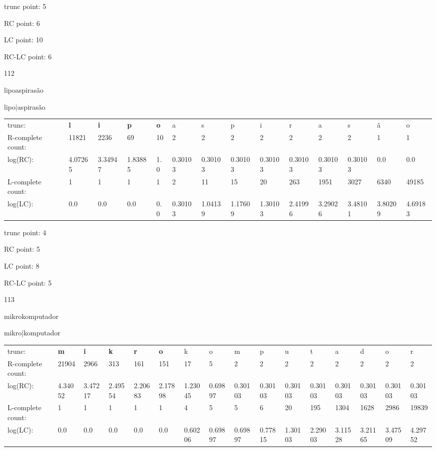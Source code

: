 \documentclass{article}
\begin{document}
trunc point: 5

RC point: 6

LC point: 10

RC-LC point: 6

\vspace{3em}



112

lipoaspirasão

lipo$|$aspirasão

\vspace{1em}

\begin{tabular}{l|lllllllllllll}

trunc: & {\color{red}\bf l} & {\color{red}\bf i} & {\color{red}\bf p} & {\color{red}\bf o} & a & s & p & i & r & a & s & ã & o \\ 
R-complete count: & 11821 & 2236 & 69 & 10 & 2 & 2 & 2 & 2 & 2 & 2 & 2 & 1 & 1 \\ 
log(RC): & 4.07265 & 3.34947 & 1.83885 & 1.0 & 0.30103 & 0.30103 & 0.30103 & 0.30103 & 0.30103 & 0.30103 & 0.30103 & 0.0 & 0.0 \\ 
L-complete count: & 1 & 1 & 1 & 1 & 2 & 11 & 15 & 20 & 263 & 1951 & 3027 & 6340 & 49185 \\ 
log(LC): & 0.0 & 0.0 & 0.0 & 0.0 & 0.30103 & 1.04139 & 1.17609 & 1.30103 & 2.41996 & 3.29026 & 3.48101 & 3.80209 & 4.69183 \\ 
\end{tabular}

trunc point: 4

RC point: 5

LC point: 8

RC-LC point: 5

\vspace{3em}



113

mikrokomputador

mikro$|$komputador

\vspace{1em}

\begin{tabular}{l|lllllllllllllll}

trunc: & {\color{red}\bf m} & {\color{red}\bf i} & {\color{red}\bf k} & {\color{red}\bf r} & {\color{red}\bf o} & k & o & m & p & u & t & a & d & o & r \\ 
R-complete count: & 21904 & 2966 & 313 & 161 & 151 & 17 & 5 & 2 & 2 & 2 & 2 & 2 & 2 & 2 & 2 \\ 
log(RC): & 4.34052 & 3.47217 & 2.49554 & 2.20683 & 2.17898 & 1.23045 & 0.69897 & 0.30103 & 0.30103 & 0.30103 & 0.30103 & 0.30103 & 0.30103 & 0.30103 & 0.30103 \\ 
L-complete count: & 1 & 1 & 1 & 1 & 1 & 4 & 5 & 5 & 6 & 20 & 195 & 1304 & 1628 & 2986 & 19839 \\ 
log(LC): & 0.0 & 0.0 & 0.0 & 0.0 & 0.0 & 0.60206 & 0.69897 & 0.69897 & 0.77815 & 1.30103 & 2.29003 & 3.11528 & 3.21165 & 3.47509 & 4.29752 \\ 
\end{tabular}
\end{document}
